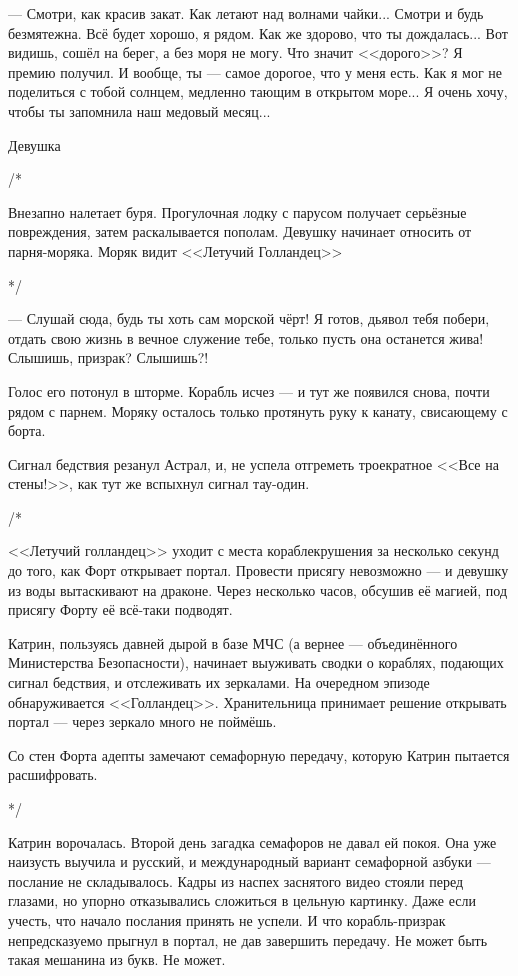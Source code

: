 --- Смотри, как красив закат. Как летают над волнами чайки... Смотри и будь безмятежна. Всё будет хорошо, я рядом.
Как же здорово, что ты дождалась... Вот видишь, сошёл на берег, а без моря не могу.
Что значит <<дорого>>? Я премию получил. И вообще, ты --- самое дорогое, что у меня есть.
Как я мог не поделиться с тобой солнцем, медленно тающим в открытом море... Я очень хочу, чтобы ты запомнила наш медовый месяц...

Девушка



\emptypar

\emptypar

/*

Внезапно налетает буря. Прогулочная лодку с парусом получает серьёзные повреждения, затем раскалывается пополам.
Девушку начинает относить от парня-моряка. Моряк видит <<Летучий Голландец>>

*/

--- Слушай сюда, будь ты хоть сам морской чёрт! Я готов, дьявол тебя побери, отдать свою жизнь в вечное служение тебе,
только пусть она останется жива! Слышишь, призрак? Слышишь?!

Голос его потонул в шторме. Корабль исчез --- и тут же появился снова, почти рядом с парнем.
Моряку осталось только протянуть руку к канату, свисающему с борта.

\emptypar

Сигнал бедствия резанул Астрал, и, не успела отгреметь троекратное <<Все на стены!>>,
как тут же вспыхнул сигнал тау-один.

/*

<<Летучий голландец>> уходит с места кораблекрушения за несколько секунд до того, как Форт открывает портал.
Провести присягу невозможно --- и девушку из воды вытаскивают на драконе.
Через несколько часов, обсушив её магией, под присягу Форту её всё-таки подводят.

\emptypar

Катрин, пользуясь давней дырой в базе МЧС (а вернее --- объединённого Министерства Безопасности),
начинает выуживать сводки о кораблях, подающих сигнал бедствия, и отслеживать их зеркалами.
На очередном эпизоде обнаруживается <<Голландец>>.
Хранительница принимает решение открывать портал --- через зеркало много не поймёшь.

Со стен Форта адепты замечают семафорную передачу, которую Катрин пытается расшифровать.

*/



Катрин ворочалась. Второй день загадка семафоров не давал ей покоя.
Она уже наизусть выучила и русский, и международный вариант семафорной азбуки --- послание не складывалось.
Кадры из наспех заснятого видео стояли перед глазами, но упорно отказывались сложиться в цельную картинку.
Даже если учесть, что начало послания принять не успели.
И что корабль-призрак непредсказуемо прыгнул в портал, не дав завершить передачу. Не может быть такая мешанина из букв. Не может.

